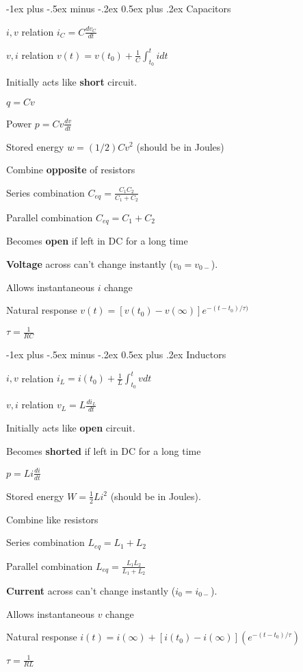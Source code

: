 \documentclass[9pt,landscape]{article}
\makeatletter
\newenvironment{itemize*}%
  {\begin{itemize}%
    \setlength{\itemsep}{1pt}%
    \setlength{\parskip}{1pt}}%
  {\end{itemize}}
\renewcommand{\section}{\@startsection{section}{1}{0mm}%
                                {-1ex plus -.5ex minus -.2ex}%
                                {0.5ex plus .2ex}%
                                {\normalfont\large\bfseries}}
\makeatother
\begin{document}
\begin{multicols}{4}
\section{Capacitors}
\begin{itemize*}
  \item $i,v$ relation $i_C = C\frac {dv_C} {dt}$
  \item $v,i$ relation $v(t) = v(t_0) + \frac {1} {C} \int_{t_0}^{t} i dt$
  \item Initially acts like {\bf short} circuit.
  \item $q = Cv$
  \item Power $p = Cv \frac {dv} {dt}$
  \item Stored energy $w = (1/2)Cv^2$ (should be in Joules)
  \item Combine {\bf opposite} of resistors
  \item Series combination $C_{eq} = \frac {C_1C_2} {C_1 + C_2}$
  \item Parallel combination $C_{eq} = C_1 + C_2$
  \item Becomes {\bf open} if left in DC for a long time
  \item {\bf Voltage} across can't change instantly ($v_0 = v_{0-}$).
  \item Allows instantaneous $i$ change
  \item Natural response $v(t) = [v(t_0) - v(\infty)] e^{-(t - t_0) / \tau)}$
  \item $\tau = \frac {1} {RC}$
\end{itemize*}
\section{Inductors}
\begin{itemize*}
  \item $i,v$ relation $i_L =  i(t_0) + \frac {1} {L} \int_{t_0}^{t} v dt$
  \item $v,i$ relation $v_L = L \frac {di_L} {dt}$
  \item Initially acts like {\bf open} circuit.
  \item Becomes {\bf shorted} if left in DC for a long time
  \item $p = Li\frac {di} {dt}$
  \item Stored energy $W = \frac {1} {2} L i^2$ (should be in Joules).
  \item Combine like resistors
  \item Series combination $L_{eq} = L_1 + L_2$
  \item Parallel combination $L_{eq} = \frac {L_1L_2} {L_1 + L_2}$
  \item {\bf Current} across can't change instantly ($i_0 = i_{0-}$).
  \item Allows instantaneous $v$ change
  \item Natural response $i(t) = i(\infty) + [i(t_0) - i(\infty)](e^{-(t-t_0) / \tau})$
  \item $\tau = \frac {1} {RL}$
\end{itemize*}


\end{multicols}
\end{document}
